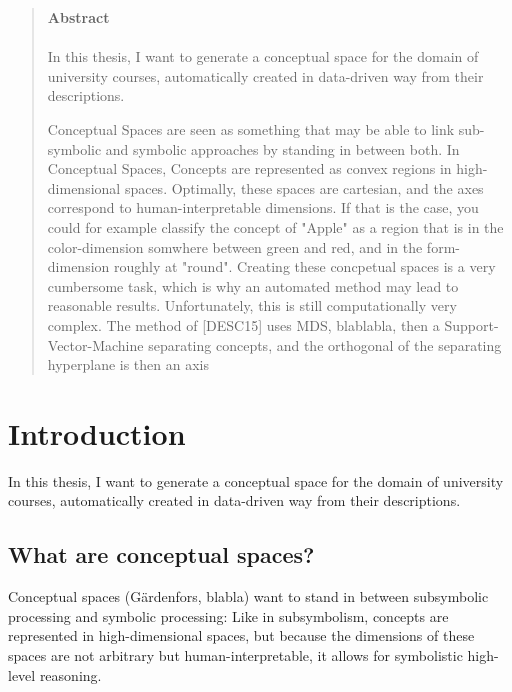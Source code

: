\documentclass[11pt,
  paper=a4, 
  bibliography=totocnumbered,
	captions=tableheading,
	BCOR=10mm
]{scrreprt}
\theoremstyle{definition}
\begin{document}
\begin{abstract}
	\textbf{\LARGE{Abstract}}\\\\
	In this thesis, I want to generate a conceptual space for the domain of university courses, automatically created in data-driven way from their descriptions.

	Conceptual Spaces are seen as something that may be able to link sub-symbolic and symbolic approaches by standing in between both. In Conceptual Spaces, Concepts are represented as convex regions in high-dimensional spaces. Optimally, these spaces are cartesian, and the axes correspond to human-interpretable dimensions. If that is the case, you could for example classify the concept of "Apple" as a region that is in the color-dimension somwhere between green and red, and in the form-dimension roughly at "round".
	Creating these concpetual spaces is a very cumbersome task, which is why an automated method may lead to reasonable results. Unfortunately, this is still computationally very complex.
	The method of [DESC15] uses MDS, blablabla, then a Support-Vector-Machine separating concepts, and the orthogonal of the separating hyperplane is then an axis
\end{abstract}




\tableofcontents
\listoffigures
\listoftables
\listofalgorithms


\chapter{Introduction}

In this thesis, I want to generate a conceptual space for the domain of university courses, automatically created in data-driven way from their descriptions.


\section{What are conceptual spaces? }

Conceptual spaces (Gärdenfors, blabla) want to stand in between subsymbolic processing and symbolic processing: Like in subsymbolism, concepts are represented in high-dimensional spaces, but because the dimensions of these spaces are not arbitrary but human-interpretable, it allows for symbolistic high-level reasoning.
\end{document}
